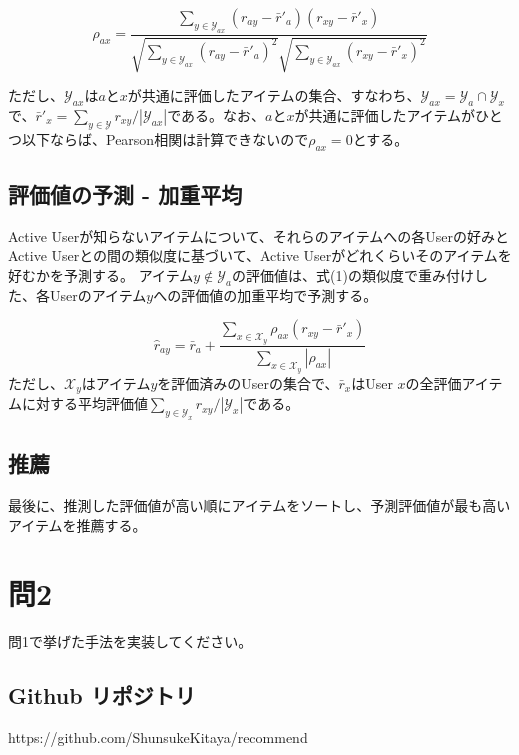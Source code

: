 \documentclass[11pt,a4j]{jsarticle}
\begin{document}
    \begin{equation}
      \rho_{ax} = \frac{\sum_{y \in \mathcal{Y}_{ax}}(r_{ay} - \bar{r}'_{a})(r_{xy} - \bar{r}'_{x})}{\sqrt{\sum_{y \in \mathcal{Y}_{ax}}(r_{ay} - \bar{r}'_{a})^2} \sqrt{\sum_{y \in \mathcal{Y}_{ax}}(r_{xy} - \bar{r}'_{x})^2}}
    \end{equation}

    ただし、$\mathcal{Y}_{ax}$は$a$と$x$が共通に評価したアイテムの集合、すなわち、$\mathcal{Y}_{ax} = \mathcal{Y}_{a} \cap \mathcal{Y}_{x}$で、$\bar{r}'_{x} = \sum_{y \in \mathcal{Y}} r_{xy} / |\mathcal{Y}_{ax}|$である。なお、$a$と$x$が共通に評価したアイテムがひとつ以下ならば、Pearson相関は計算できないので$\rho_{ax} = 0$とする。

    \subsection*{評価値の予測 - 加重平均}
    Active Userが知らないアイテムについて、それらのアイテムへの各Userの好みとActive Userとの間の類似度に基づいて、Active Userがどれくらいそのアイテムを好むかを予測する。
    アイテム$y \notin \mathcal{Y}_{a}$の評価値は、式(1)の類似度で重み付けした、各Userのアイテム$y$への評価値の加重平均で予測する。

    \begin{equation}
      \hat{r}_{ay} = \bar{r}_{a} + \frac{\sum_{x \in \mathcal{X}_{y}} \rho_{ax} (r_{xy} - \bar{r}'_{x})}{\sum_{x \in \mathcal{X}_{y}} |\rho_{ax}|}
    \end{equation}
    ただし、$\mathcal{X}_{y}$はアイテム$y$を評価済みのUserの集合で、$\bar{r}_{x}$はUser $x$の全評価アイテムに対する平均評価値$\sum_{y \in \mathcal{Y}_{x}} r_{xy} / |\mathcal{Y}_{x}|$である。

    \subsection*{推薦}
    最後に、推測した評価値が高い順にアイテムをソートし、予測評価値が最も高いアイテムを推薦する。

\newpage

  \section*{問2}
  問1で挙げた手法を実装してください。
    \subsection*{Github リポジトリ}
    https://github.com/ShunsukeKitaya/recommend
\end{document}
